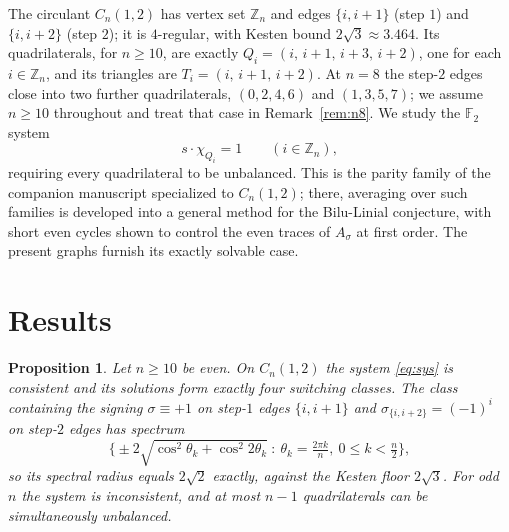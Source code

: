 \documentclass[11pt]{article}
\newtheorem{proposition}[lemma]{Proposition}
\theoremstyle{remark}
\newcommand{\F}{\mathbb{F}}
\begin{document}
The circulant $C_n(1,2)$ has vertex set $\mathbb Z_n$ and edges
$\{i,i{+}1\}$ (step $1$) and $\{i,i{+}2\}$ (step $2$); it is
$4$-regular, with Kesten bound $2\sqrt3\approx3.464$. Its
quadrilaterals, for $n\ge10$, are exactly
$Q_i=(i,\,i{+}1,\,i{+}3,\,i{+}2)$, one for each $i\in\mathbb Z_n$, and
its triangles are $T_i=(i,\,i{+}1,\,i{+}2)$. At $n=8$ the step-$2$
edges close into two further quadrilaterals, $(0,2,4,6)$ and
$(1,3,5,7)$; we assume $n\ge10$ throughout and treat that case in
Remark~\ref{rem:n8}. We study the $\F_2$ system
\begin{equation}\label{eq:sys}
s\cdot\chi_{Q_i}=1\qquad(i\in\mathbb Z_n),
\end{equation}
requiring every quadrilateral to be unbalanced. This is the parity
family of the companion manuscript \cite{companionA} specialized to
$C_n(1,2)$; there, averaging over such families is developed into a
general method for the Bilu-Linial conjecture, with short even cycles
shown to control the even traces of $A_\sigma$ at first order. The
present graphs furnish its exactly solvable case.

\section{Results}

\begin{proposition}\label{prop:circ}
Let $n\ge10$ be even. On $C_n(1,2)$ the system \eqref{eq:sys}
is consistent and its solutions form exactly four switching classes. The
class containing the signing $\sigma\equiv+1$ on step-$1$ edges
$\{i,i{+}1\}$ and $\sigma_{\{i,i+2\}}=(-1)^i$ on step-$2$ edges has
spectrum
\[
\Big\{\pm2\sqrt{\cos^2\theta_k+\cos^2 2\theta_k}\ :\
\theta_k=\tfrac{2\pi k}{n},\ 0\le k<\tfrac n2\Big\},
\]
so its spectral radius equals $2\sqrt2$ exactly, against the Kesten floor
$2\sqrt3$. For odd $n$ the system is inconsistent, and at most $n-1$
quadrilaterals can be simultaneously unbalanced.
\end{proposition}
\end{document}
